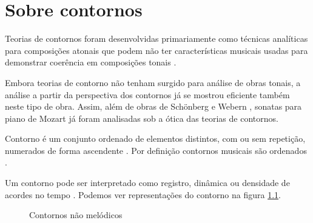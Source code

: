 \chapter{Sobre contornos}
\label{cha:sobre-contornos}





Teorias de contornos foram desenvolvidas primariamente como técnicas
analíticas para composições atonais que podem não ter características
musicais usadas para demonstrar coerência em composições tonais
\cite[p. 1]{beard03:contour}.

Embora teorias de contorno não tenham surgido para análise de obras
tonais, a análise a partir da perspectiva dos contornos já se mostrou
eficiente também neste tipo de obra. Assim, além de obras de Schönberg
\cite{friedmann85:methodology} e Webern \cite{clifford95:contour},
sonatas para piano de Mozart \cite{beard03:contour} já foram
analisadas sob a ótica das teorias de contornos.

Contorno é um conjunto ordenado de elementos distintos, com ou sem
repetição, numerados de forma ascendente
\cite[p. 206]{morris93:directions}. Por definição contornos musicais
são ordenados \cite[p. 228]{marvin.ea87:relating}.

Um contorno pode ser interpretado como registro, dinâmica ou densidade
de acordes no tempo \cite[p. 206]{morris93:directions}
\cite[p. 22]{clifford95:contour}. Podemos ver representações do
contorno  na figura
\ref{fig:non-melodic-contours}.

\begin{figure}
  \centering

  \caption{Contornos  não melódicos}
  \label{fig:non-melodic-contours}
\end{figure}

